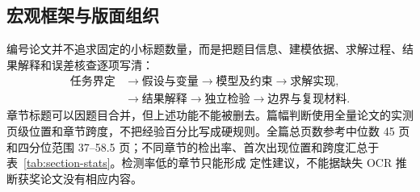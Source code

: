 \documentclass[UTF8,a4paper,12pt]{ctexart}
\begin{document}
\subsection{宏观框架与版面组织}

编号论文并不追求固定的小标题数量，而是把题目信息、建模依据、求解过程、结果解释和误差核查逐项写清：
\[
\begin{aligned}
\text{任务界定}&\longrightarrow\text{假设与变量}
\longrightarrow\text{模型及约束}\longrightarrow\text{求解实现},\\
&\longrightarrow\text{结果解释}
\longrightarrow\text{独立检验}\longrightarrow\text{边界与复现材料}.
\end{aligned}
\]
章节标题可以因题目合并，但上述功能不能被删去。篇幅判断使用全量论文的实测
页级位置和章节跨度，不把经验百分比写成硬规则。全篇总页数参考中位数
45 页和四分位范围 37--58.5 页；不同章节的检出率、首次出现位置和跨度汇总于
表~\ref{tab:section-stats}。检测率低的章节只能形成
定性建议，不能据缺失 OCR 推断获奖论文没有相应内容。
\end{document}
